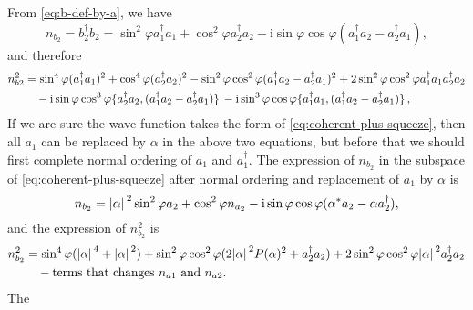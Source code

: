 \documentclass[hyperref, a4paper]{article}
\newcommand*{\ii}{\mathrm{i}}
\begin{document}
From \eqref{eq:b-def-by-a}, we have 
\begin{equation}
    n_{b_2} = b_2^\dagger b_2 = 
    \sin^2 \varphi a_1^\dagger a_1 + \cos^2 \varphi a_2^\dagger a_2
    - \ii \sin \varphi \cos \varphi (a_1^\dagger a_2 - a_2^\dagger a_1),
\end{equation}
and therefore 
\begin{equation}
    \begin{aligned}
        n_{b2}^2 &= \sin^4 \varphi (a_1^\dagger a_1)^2 + \cos^4 \varphi (a_2^\dagger a_2)^2 - \sin^2 \varphi \cos^2 \varphi (a_1^\dagger a_2 - a_2^\dagger a_1)^2 + 2 \sin^2 \varphi \cos^2 \varphi a_1^\dagger a_1 a_2^\dagger a_2 \\
        &\quad - \ii \sin \varphi \cos^3 \varphi \acomm*{a_2^\dagger a_2}{(a_1^\dagger a_2 - a_2^\dagger a_1)}
        - \ii \sin^3 \varphi \cos \varphi \acomm*{a_1^\dagger a_1}{(a_1^\dagger a_2 - a_2^\dagger a_1)},
    \end{aligned}
\end{equation}
If we are sure the wave function takes the form of \eqref{eq:coherent-plus-squeeze},
then all $a_1$ can be replaced by $\alpha$ in the above two equations,
but before that we should first complete normal ordering of $a_1$ and $a_1^\dagger$.
The expression of $n_{b_2}$ 
in the subspace of \eqref{eq:coherent-plus-squeeze}
after normal ordering and replacement of $a_1$ by $\alpha$ is 
\begin{equation}
    n_{b_2} = \abs*{\alpha}^2 \sin^2 \varphi a_2 + \cos^2 \varphi n_{a_2} 
    - \ii \sin \varphi \cos \varphi (\alpha^* a_2 - \alpha a_2^\dagger),
\end{equation}
and the expression of $n_{b_2}^2$ is 
\begin{equation}
    \begin{aligned}
        n_{b_2}^2 &= \sin^4 \varphi (\abs*{\alpha}^4 + \abs*{\alpha}^2) + \sin^2 \varphi \cos^2 \varphi (2 \abs*{\alpha}^2 P(\alpha)^2 + a_2^\dagger a_2) + 2 \sin^2 \varphi \cos^2 \varphi \abs*{\alpha}^2 a_2^\dagger a_2 \\
        &\quad - \text{terms that changes $n_{a1}$ and $n_{a2}$}.
    \end{aligned}
    \label{eq:nb2-square-mf}
\end{equation}
The 



\end{document}
